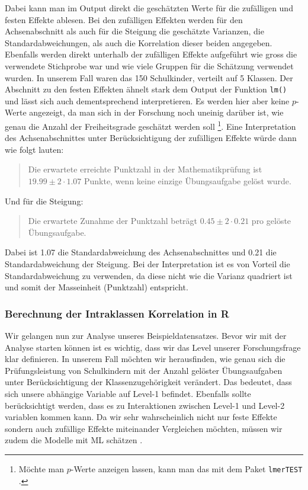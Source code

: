\documentclass[12pt]{article}\usepackage[]{graphicx}\usepackage[]{color}
\begin{document}
Dabei kann man im Output direkt die geschätzten Werte für die zufälligen und festen Effekte ablesen. Bei den zufälligen Effekten werden für den Achsenabschnitt als auch für die Steigung die geschätzte Varianzen, die Standardabweichungen, als auch die Korrelation dieser beiden angegeben. Ebenfalls werden direkt unterhalb der zufälligen Effekte aufgeführt wie gross die verwendete Stichprobe war und wie viele Gruppen für die Schätzung verwendet wurden. In unserem Fall waren das 150 Schulkinder, verteilt auf 5 Klassen. Der Abschnitt zu den festen Effekten ähnelt stark dem Output der Funktion \texttt{lm()} und lässt sich auch dementsprechend interpretieren. Es werden hier aber keine $p$-Werte angezeigt, da man sich in der Forschung noch uneinig darüber ist, wie genau die Anzahl der Freiheitsgrade geschätzt werden soll \citep{PEUGH201085,SnijdersTomA.B2012Ma:a}\footnote{Möchte man $p$-Werte anzeigen lassen, kann man das mit dem Paket \texttt{lmerTEST} \citep{lmertest}.}. Eine Interpretation des Achsenabschnittes unter Berücksichtigung der zufälligen Effekte würde dann wie folgt lauten: 
\begin{quote}
Die erwartete erreichte Punktzahl in der Mathematikprüfung ist $19.99 \pm 2 \cdot 1.07$ Punkte, wenn keine einzige Übungsaufgabe gelöst wurde.
\end{quote}
Und für die Steigung:
\begin{quote}
Die erwartete Zunahme der Punktzahl beträgt $0.45 \pm 2 \cdot 0.21$ pro gelöste Übungsaufgabe.
\end{quote}
Dabei ist 1.07 die Standardabweichung des Achsenabschnittes und 0.21 die Standardabweichung der Steigung. Bei der Interpretation ist es von Vorteil die Standardabweichung zu verwenden, da diese nicht wie die Varianz quadriert ist und somit der Masseinheit (Punktzahl) entspricht. 

\subsubsection{Berechnung der Intraklassen Korrelation in R} \label{section:icc_r}
Wir gelangen nun zur Analyse unseres Beispieldatensatzes. Bevor wir mit der Analyse starten können ist es wichtig, dass wir das Level unserer Forschungsfrage klar definieren. In unserem Fall möchten wir herausfinden, wie genau sich die Prüfungsleistung von Schulkindern mit der Anzahl gelöster Übungsaufgaben unter Berücksichtigung der Klassenzugehörigkeit verändert. Das bedeutet, dass sich unsere abhängige Variable auf Level-1 befindet. Ebenfalls sollte berücksichtigt werden, dass es zu Interaktionen zwischen Level-1 und Level-2 variablen kommen kann. Da wir sehr wahrscheinlich nicht nur feste Effekte sondern auch zufällige Effekte miteinander Vergleichen möchten, müssen wir zudem die Modelle mit ML schätzen \citep{PEUGH201085}. 
\end{document}
